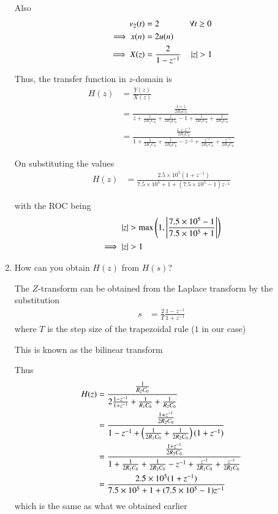 \documentclass[journal,12pt,twocolumn]{IEEEtran}
\renewcommand\thesection{\arabic{section}}
\begin{document}
\begin{enumerate}[label=\thesection.\arabic*.,ref=\thesection.\theenumi]
    Also
    \begin{align}
        v_2(t) &= 2 &&\forall t \ge 0\\
        \implies x(n) &= 2u(n) \\
        \implies X(z) &= \frac{2}{1-z^{-1}} &&\left\vert z\right\vert > 1
    \end{align}
    
    Thus, the transfer function in $z$-domain is
    \begin{align}
        H(z) &= \frac{Y(z)}{X(z)} \\
        &= \frac{\frac{1+z}{2R_2C_0}}{z + \frac{z}{2R_1C_0} + \frac{z}{2R_2C_0} - 1 + \frac{1}{2R_1C_0} + \frac{1}{2R_2C_0}} \\
        &= \frac{\frac{1 + z^{-1}}{2R_2C_0}}{1 + \frac{1}{2R_1C_0} + \frac{1}{2R_2C_0} - z^{-1} + \frac{z^{-1}}{2R_1C_0} + \frac{z^{-1}}{2R_2C_0}}
    \end{align}
    
    On substituting the values
    \begin{align}
        H(z) &= \frac{2.5\times10^5 (1+z^{-1})}{7.5\times10^5 + 1 + (7.5\times10^5 - 1)z^{-1}}
    \end{align}
    
    with the ROC being
    \begin{align}
        \left\vert z\right\vert &> \max\left(1, \left\vert\frac{7.5\times10^5 - 1}{7.5\times10^5 + 1}\right\vert\right) \\
        \implies \left\vert z\right\vert &> 1
    \end{align}
    
    \item How can you obtain $H(z)$ from $H(s)$?
    
    \solution The $Z$-transform can be obtained from the Laplace transform by the substitution
    \begin{align}
        s &= \frac{2}{T} \frac{1-z^{-1}}{1+z^{-1}}
    \end{align}
    where $T$ is the step size of the trapezoidal rule ($1$ in our case)
    
    This is known as the bilinear transform
    
    Thus
    \begin{align}
        H(z) &= \frac{\frac{1}{R_2C_0}}{2\frac{1-z^{-1}}{1+z^{-1}} + \frac{1}{R_1C_0} + \frac{1}{R_2C_0}} \\
        &= \frac{\frac{1 + z^{-1}}{2R_2C_0}}{1-z^{-1}	 + \left(\frac{1}{2R_1C_0} + \frac{1}{2R_2C_0}\right)(1 + z^{-1})} \\
        &= \frac{\frac{1 + z^{-1}}{2R_2C_0}}{1 + \frac{1}{2R_1C_0} + \frac{1}{2R_2C_0} - z^{-1} + \frac{z^{-1}}{2R_1C_0} + \frac{z^{-1}}{2R_2C_0}} \\
        &= \frac{2.5\times10^5 (1+z^{-1})}{7.5\times10^5 + 1 + (7.5\times10^5 - 1)z^{-1}}
    \end{align}
    which is the same as what we obtained earlier
            \end{enumerate}
\end{document}

